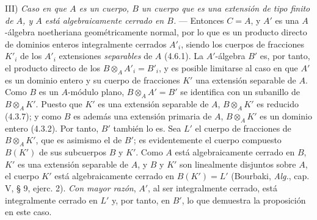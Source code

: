 III) \emph{Caso en que $A$ es un cuerpo, $B$ un cuerpo que es una
extensión de tipo finito de $A$, y $A$ está algebraicamente cerrado
en $B$.} --- Entonces $C=A$, y $A'$ es una $A$-álgebra noetheriana
geométricamente normal, por lo que es un producto directo de
dominios enteros integralmente cerrados $A'_i$, siendo los cuerpos de
fracciones $K'_i$ de los $A'_i$ extensiones \emph{separables} de $A$ (4.6.1). La
$A'$-álgebra $B'$ es, por tanto, el producto directo de los
$B\otimes_A A'_i=B'_i$, y es posible limitarse al caso en que $A'$ es
un dominio entero y su cuerpo de fracciones $K'$ una extensión
separable de $A$. Como $B$ es un $A$-módulo plano,
$B\otimes_A A'=B'$ se identifica con un subanillo de
$B\otimes_A K'$. Puesto que $K'$ es una extensión separable de $A$,
$B\otimes_A K'$ es reducido (4.3.7); y como $B$ es además una
extensión primaria de $A$, $B\otimes_A K'$ es un dominio entero
(4.3.2). Por tanto, $B'$ también lo es. Sea $L'$ el cuerpo de
fracciones de $B\otimes_A K'$, que es asimismo el de $B'$; es
evidentemente el cuerpo compuesto $B(K')$ de sus subcuerpos $B$ y
$K'$. Como $A$ está algebraicamente cerrado en $B$, $K'$ es una
extensión separable de $A$, y $B$ y $K'$ son linealmente disjuntos
sobre $A$, el cuerpo $K'$ está algebraicamente cerrado en
$B(K')=L'$ (Bourbaki, \emph{Alg.}, cap. V, § 9, ejerc. 2). \emph{Con mayor
razón}, $A'$, al ser integralmente cerrado, está integralmente
cerrado en $L'$ y, por tanto, en $B'$, lo que demuestra la
proposición en este caso.

